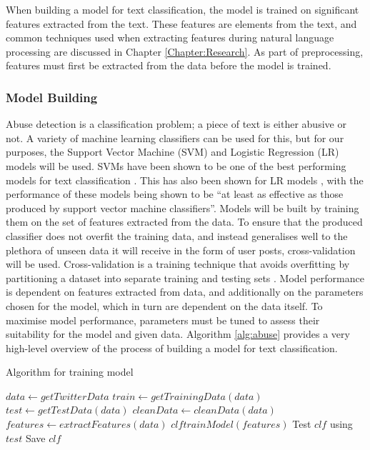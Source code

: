 When building a model for text classification, the model is trained on significant features extracted from the text. These features are elements from the text, and common techniques used when extracting features during natural language processing are discussed in Chapter \ref{Chapter:Research}. As part of preprocessing, features must first be extracted from the data before the model is trained.

\subsubsection{Model Building}
Abuse detection is a classification problem; a piece of text is either abusive or not. A variety of machine learning classifiers can be used for this, but for our purposes, the Support Vector Machine (SVM) and Logistic Regression (LR) models will be used. SVMs have been shown to be one of the best performing models for text classification \cite{joachims1998text}. This has also been shown for LR models \cite{genkin2007large}, with the performance of these models being shown to be ``at least as effective as those produced by support vector machine classifiers''. Models will be built by training them on the set of features extracted from the data. To ensure that the produced classifier does not overfit the training data, and instead generalises well to the plethora of unseen data it will receive in the form of user posts, cross-validation will be used. Cross-validation is a training technique that avoids overfitting by partitioning a dataset into separate training and testing sets \cite{scikit:cross-val}. Model performance is dependent on features extracted from data, and additionally on the parameters chosen for the model, which in turn are dependent on the data itself. To maximise model performance, parameters must be tuned to assess their suitability for the model and given data. Algorithm \ref{alg:abuse} provides a very high-level overview of the process of building a model for text classification.

\begin{algorithm}
\caption{Algorithm for training model}
\label{alg:abuse}
\begin{algorithmic}[1]
\State $data\gets getTwitterData$
\State $train\gets getTrainingData(data)$
\State $test\gets getTestData(data)$
\State $cleanData\gets cleanData(data)$
\State $features\gets extractFeatures(data)$
\State $clf trainModel(features)$
\State Test $clf$ using $test$
\State Save $clf$
\end{algorithmic}
\end{algorithm}

